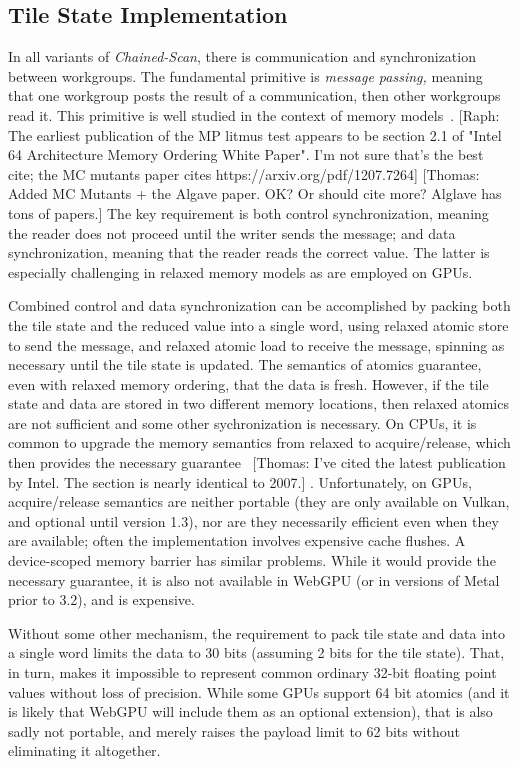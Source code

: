 \documentclass[sigconf]{acmart}
\newcommand{\thomas}[1]{{\footnotesize\color{orange}[Thomas: #1]}}
\newcommand{\raph}[1]{{\footnotesize\color{magenta}[Raph: #1]}}
\begin{document}
\subsection{Tile State Implementation}
In all variants of \emph{Chained-Scan}, there is communication and synchronization between workgroups. The fundamental primitive is \emph{message passing,} meaning that one workgroup posts the result of a communication, then other workgroups read it. This primitive is well studied in the context of memory models~\cite{Alglave0, MCMutants}. \raph{The earliest publication of the MP litmus test appears to be section 2.1 of "Intel 64 Architecture Memory Ordering White Paper". I'm not sure that's the best cite; the MC mutants paper cites https://arxiv.org/pdf/1207.7264} \thomas{Added MC Mutants + the Algave paper. OK? Or should cite more? Alglave has tons of papers.} The key requirement is both control synchronization, meaning the reader does not proceed until the writer sends the message; and data synchronization, meaning that the reader reads the correct value. The latter is especially challenging in relaxed memory models as are employed on GPUs.

Combined control and data synchronization can be accomplished by packing both the tile state and the reduced value into a single word, using relaxed atomic store to send the message, and relaxed atomic load to receive the message, spinning as necessary until the tile state is updated. The semantics of atomics guarantee, even with relaxed memory ordering, that the data is fresh. However, if the tile state and data are stored in two different memory locations, then relaxed atomics are not sufficient and some other sychronization is necessary. On CPUs, it is common to upgrade the memory semantics from relaxed to acquire/release, which then provides the necessary guarantee~\cite[Section 10.2]{intel_sdm_2024} \thomas{I've cited the latest publication by Intel. The section is nearly identical to 2007.} . Unfortunately, on GPUs, acquire/release semantics are neither portable (they are only available on Vulkan, and optional until version 1.3), nor are they necessarily efficient even when they are available; often the implementation involves expensive cache flushes. A device-scoped memory barrier has similar problems. While it would provide the necessary guarantee, it is also not available in WebGPU (or in versions of Metal prior to 3.2), and is expensive.

Without some other mechanism, the requirement to pack tile state and data into a single word limits the data to 30 bits (assuming 2 bits for the tile state). That, in turn, makes it impossible to represent common ordinary 32-bit floating point values without loss of precision. While some GPUs support 64 bit atomics (and it is likely that WebGPU will include them as an optional extension), that is also sadly not portable, and merely raises the payload limit to 62 bits without eliminating it altogether.
\end{document}
